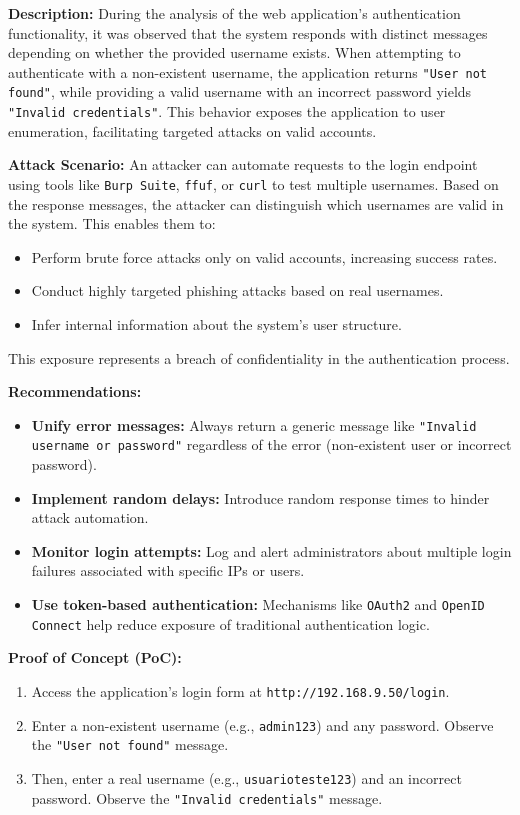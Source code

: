 \documentclass[a4paper,12pt]{article}
\begin{document}
\textbf{Description:}  
During the analysis of the web application's authentication functionality, it was observed that the system responds with distinct messages depending on whether the provided username exists. When attempting to authenticate with a non-existent username, the application returns \texttt{"User not found"}, while providing a valid username with an incorrect password yields \texttt{"Invalid credentials"}. This behavior exposes the application to user enumeration, facilitating targeted attacks on valid accounts.

\textbf{Attack Scenario:}  
An attacker can automate requests to the login endpoint using tools like \texttt{Burp Suite}, \texttt{ffuf}, or \texttt{curl} to test multiple usernames. Based on the response messages, the attacker can distinguish which usernames are valid in the system. This enables them to:  
\begin{itemize}
    \item Perform brute force attacks only on valid accounts, increasing success rates.  
    \item Conduct highly targeted phishing attacks based on real usernames.  
    \item Infer internal information about the system's user structure.  
\end{itemize}
This exposure represents a breach of confidentiality in the authentication process.

\textbf{Recommendations:}  
\begin{itemize}
    \item \textbf{Unify error messages:} Always return a generic message like \texttt{"Invalid username or password"} regardless of the error (non-existent user or incorrect password).  
    \item \textbf{Implement random delays:} Introduce random response times to hinder attack automation.  
    \item \textbf{Monitor login attempts:} Log and alert administrators about multiple login failures associated with specific IPs or users.  
    \item \textbf{Use token-based authentication:} Mechanisms like \texttt{OAuth2} and \texttt{OpenID Connect} help reduce exposure of traditional authentication logic.  
\end{itemize}

\textbf{Proof of Concept (PoC):}  
\begin{enumerate}
    \item Access the application's login form at \texttt{http://192.168.9.50/login}.  
    \item Enter a non-existent username (e.g., \texttt{admin123}) and any password. Observe the \texttt{"User not found"} message.  
    \item Then, enter a real username (e.g., \texttt{usuarioteste123}) and an incorrect password. Observe the \texttt{"Invalid credentials"} message.  
\end{enumerate}
\end{document}
